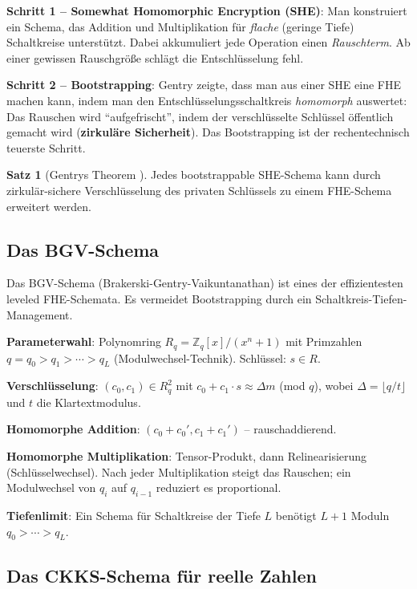 ﻿\documentclass[a4paper,12pt]{scrreprt}
\theoremstyle{definition}
\newtheorem{satz}{Satz}[section]
\begin{document}
\textbf{Schritt 1 -- Somewhat Homomorphic Encryption (SHE)}: Man konstruiert ein Schema, das Addition und Multiplikation für \emph{flache} (geringe Tiefe) Schaltkreise unterstützt. Dabei akkumuliert jede Operation einen \emph{Rauschterm}. Ab einer gewissen Rauschgröße schlägt die Entschlüsselung fehl.

\textbf{Schritt 2 -- Bootstrapping}: Gentry zeigte, dass man aus einer SHE eine FHE machen kann, indem man den Entschlüsselungsschaltkreis \emph{homomorph} auswertet: Das Rauschen wird ``aufgefrischt'', indem der verschlüsselte Schlüssel öffentlich gemacht wird (\textbf{zirkuläre Sicherheit}). Das Bootstrapping ist der rechentechnisch teuerste Schritt.

\begin{satz}[Gentrys Theorem \cite{Gen09}]
Jedes bootstrappable SHE-Schema kann durch zirkulär-sichere Verschlüsselung des privaten Schlüssels zu einem FHE-Schema erweitert werden.
\end{satz}

\subsection{Das BGV-Schema}

Das BGV-Schema (Brakerski-Gentry-Vaikuntanathan) \cite{BGV12} ist eines der effizientesten leveled FHE-Schemata. Es vermeidet Bootstrapping durch ein Schaltkreis-Tiefen-Management.

\textbf{Parameterwahl}: Polynomring $R_q = \mathbb{Z}_q[x]/(x^n+1)$ mit Primzahlen $q = q_0 > q_1 > \cdots > q_L$ (Modulwechsel-Technik). Schlüssel: $s \in R$.

\textbf{Verschlüsselung}: $(c_0, c_1) \in R_q^2$ mit $c_0 + c_1 \cdot s \approx \Delta m$ (mod $q$), wobei $\Delta = \lfloor q/t\rfloor$ und $t$ die Klartextmodulus.

\textbf{Homomorphe Addition}: $(c_0+c_0', c_1+c_1')$ -- rauschaddierend.

\textbf{Homomorphe Multiplikation}: Tensor-Produkt, dann Relinearisierung (Schlüsselwechsel). Nach jeder Multiplikation steigt das Rauschen; ein Modulwechsel von $q_i$ auf $q_{i-1}$ reduziert es proportional.

\textbf{Tiefenlimit}: Ein Schema für Schaltkreise der Tiefe $L$ benötigt $L+1$ Moduln $q_0 > \cdots > q_L$.

\subsection{Das CKKS-Schema für reelle Zahlen}
\end{document}

